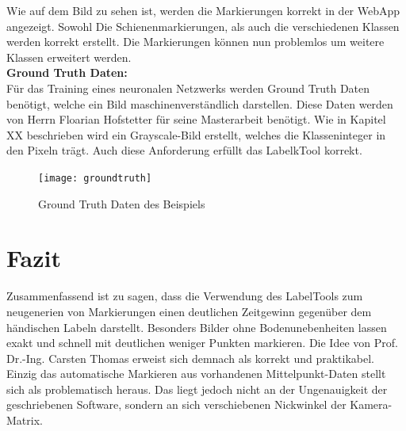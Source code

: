 \documentclass[11pt]{scrartcl}
\begin{document}
\noindent
Wie auf dem Bild zu sehen ist, werden die Markierungen korrekt in der WebApp angezeigt. Sowohl Die Schienenmarkierungen, als auch die verschiedenen Klassen werden korrekt erstellt. Die Markierungen können nun problemlos um weitere Klassen erweitert werden.
\\

\noindent
\textbf{Ground Truth Daten:}
\\

\noindent
Für das Training eines neuronalen Netzwerks werden Ground Truth Daten benötigt, welche ein Bild maschinenverständlich darstellen. Diese Daten werden von Herrn Floarian Hofstetter für seine Masterarbeit benötigt. Wie in Kapitel XX beschrieben wird ein Grayscale-Bild erstellt, welches die Klasseninteger in den Pixeln trägt. Auch diese Anforderung erfüllt das LabelkTool korrekt.
\begin{figure}[H]
  \texttt{[image: groundtruth]}
  \caption{Ground Truth Daten des Beispiels}
\end{figure}


\section{Fazit}
\label{sec:Fazit}

\noindent
Zusammenfassend ist zu sagen, dass die Verwendung des LabelTools zum neugenerien von Markierungen einen deutlichen Zeitgewinn gegenüber dem händischen Labeln darstellt. Besonders Bilder ohne Bodenunebenheiten lassen exakt und schnell mit deutlichen weniger Punkten markieren. Die Idee von Prof. Dr.-Ing. Carsten Thomas erweist sich demnach als korrekt und praktikabel. Einzig das automatische Markieren aus vorhandenen Mittelpunkt-Daten stellt sich als problematisch heraus. Das liegt jedoch nicht an der Ungenauigkeit der geschriebenen Software, sondern an sich verschiebenen Nickwinkel der Kamera-Matrix. 
\end{document}
